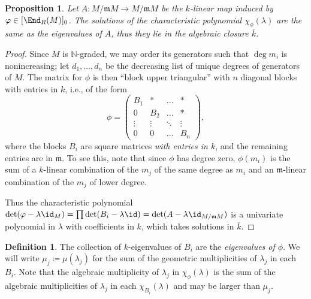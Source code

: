 \documentclass[12pt]{amsart}
\let\bar\overline
\def\NN{\mathbb N}
\def\m{\mathfrak m}
\theoremstyle{theorem}
\numberwithin{thm}{section}
\newtheorem{prop}[thm]{Proposition}
\theoremstyle{definition}
\newtheorem{dfn}[thm]{Definition}
\begin{document}
\begin{prop}\label{prop:eigenvalues}
  Let $A\colon M/\m M\to M/\m M$ be the $k$-linear map induced by $\phi\in[\End_R(M)]_0$. The solutions of the characteristic polynomial $\chi_\phi(\lambda)$ are the same as the eigenvalues of $A$, thus they lie in the algebraic closure $\bar k$.
\end{prop}
\begin{proof}
  Since $M$ is $\NN$-graded, we may order its generators such that $\deg m_i$ is nonincreasing; let $d_1,\dots,d_n$ be the decreasing list of unique degrees of generators of $M$.
The matrix for $\phi$ is then ``block upper triangular'' with $n$ diagonal blocks with entries in $k$, i.e., of the form
  \begin{equation}\label{eq:blocks}
    \phi = \begin{pmatrix}
    B_1    & *      & \dots  & *      \\
    0      & B_2    & \dots  & *      \\
    \vdots & \vdots & \ddots & \vdots \\
    0      & 0      & \dots  & B_n
    \end{pmatrix},
  \end{equation}
  where the blocks $B_i$ are square matrices \emph{with entries in $k$}, and the remaining entries are in $\m$. To see this, note that since $\phi$ has degree zero, $\phi(m_i)$ is the sum of a $k$-linear combination of the $m_j$ of the same degree as $m_i$ and an $\m$-linear combination of the $m_j$ of lower degree. %

  Thus the characteristic polynomial $\det(\phi - \lambda \id_M) = \prod \det(B_i - \lambda\id) = \det(A - \lambda \id_{M/\m M})$ is a univariate polynomial in $\lambda$ with coefficients in $k$, which takes solutions in $\bar k$.
\end{proof}

\begin{dfn}\label{def:eigenvalues}
  The collection of $k$-eigenvalues of $B_i$ are the \emph{eigenvalues of $\phi$}. We will write $\mu_j \coloneqq \mu(\lambda_j)$ for the sum of the geometric multiplicities of $\lambda_j$ in each $B_i$. Note that the algebraic multiplicity of $\lambda_j$ in $\chi_\phi(\lambda)$ is the sum of the algebraic multiplicities of $\lambda_j$ in each $\chi_{B_i}(\lambda)$ and may be larger than $\mu_j$.
\end{dfn}
\end{document}
